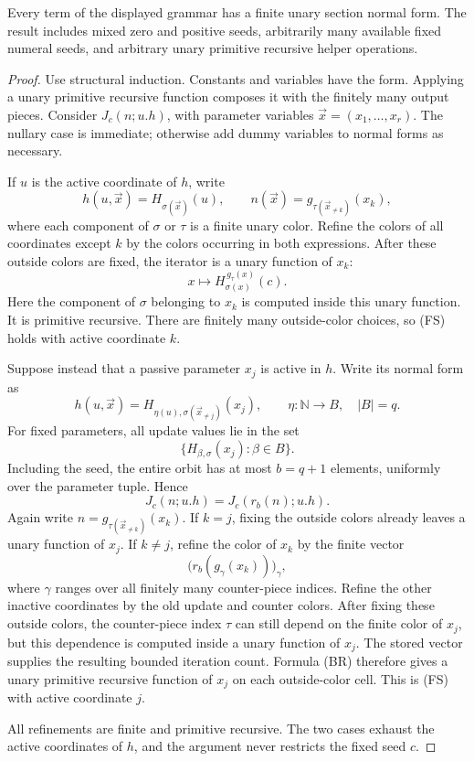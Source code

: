 \begin{theorem}
Every term of the displayed grammar has a finite unary section normal
form. The result includes mixed zero and positive seeds, arbitrarily
many available fixed numeral seeds, and arbitrary unary primitive
recursive helper operations.
\end{theorem}
\begin{proof}
Use structural induction. Constants and variables have the form.
Applying a unary primitive recursive function composes it with the
finitely many output pieces. Consider \(J_c(n;u.h)\), with parameter
variables \(\vec x=(x_1,\ldots,x_r)\). The nullary case is immediate;
otherwise add dummy variables to normal forms as necessary.

If \(u\) is the active coordinate of \(h\), write
\[
 h(u,\vec x)=H_{\sigma(\vec x)}(u),\qquad
 n(\vec x)=g_{\tau(\vec x_{\ne k})}(x_k),
\]
where each component of \(\sigma\) or \(\tau\) is a finite unary color.
Refine the colors of all coordinates except \(k\) by the colors
occurring in both expressions. After these outside colors are fixed,
the iterator is a unary function of \(x_k\):
\[
 x\longmapsto H_{\sigma(x)}^{\,g_\tau(x)}(c).
\]
Here the component of \(\sigma\) belonging to \(x_k\) is computed inside
this unary function. It is primitive recursive. There are finitely
many outside-color choices, so (FS) holds with active coordinate \(k\).

Suppose instead that a passive parameter \(x_j\) is active in \(h\).
Write its normal form as
\[
 h(u,\vec x)=H_{\eta(u),\sigma(\vec x_{\ne j})}(x_j),
 \qquad \eta:\mathbb N\to B,\quad |B|=q.
\]
For fixed parameters, all update values lie in the set
\[
 \{H_{\beta,\sigma}(x_j):\beta\in B\}.
\]
Including the seed, the entire orbit has at most \(b=q+1\) elements,
uniformly over the parameter tuple. Hence
\[
 J_c(n;u.h)=J_c(r_b(n);u.h).                             \tag{BR}
\]
Again write \(n=g_{\tau(\vec x_{\ne k})}(x_k)\).
If \(k=j\), fixing the outside colors already leaves a unary function
of \(x_j\). If \(k\ne j\), refine the color of \(x_k\) by the finite
vector
\[
 \bigl(r_b(g_\gamma(x_k))\bigr)_\gamma,
\]
where \(\gamma\) ranges over all finitely many counter-piece indices.
Refine the other inactive coordinates by the old update and counter
colors. After fixing these outside colors, the counter-piece index
\(\tau\) can still depend on the finite color of \(x_j\), but this
dependence is computed inside a unary function of \(x_j\). The stored
vector supplies the resulting bounded iteration count. Formula (BR)
therefore gives a unary primitive recursive function of \(x_j\) on
each outside-color cell. This is (FS) with active coordinate \(j\).

All refinements are finite and primitive recursive. The two cases
exhaust the active coordinates of \(h\), and the argument never
restricts the fixed seed \(c\).
\end{proof}


